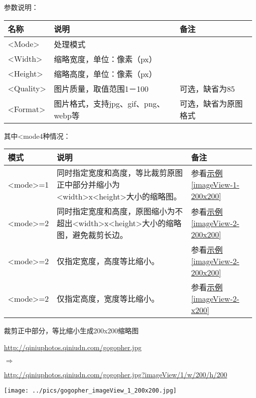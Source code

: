 \documentclass[11pt, oneside]{book}
\newcommand{\qpar}[1]{
\vspace{0.25em}
\noindent
#1\par
\vspace{0.25em}
}
\newcommand{\qurl}[1]{\url{#1}}
\newcommand{\qtable}[1]{\footnotesize\vspace{0.5em}#1\vspace{0.5em}\normalsize}
\begin{document}
\begin{CJK*}{UTF8}{song}
\qpar{参数说明：}
\qtable{
\def\arraystretch{1.5}
\begin{tabular}{|l|l|l|}
\hline
名称 & 说明 & 备注\\
\hline
\textless Mode\textgreater & 处理模式 & \\
\hline
\textless Width\textgreater & 缩略宽度，单位：像素（px） & \\
\hline
\textless Height\textgreater & 缩略高度，单位：像素（px） & \\
\hline
\textless Quality\textgreater & 图片质量，取值范围1－100 & 可选，缺省为85 \\
\hline
\textless Format\textgreater & 图片格式，支持jpg、gif、png、webp等 & 可选，缺省为原图格式 \\
\hline
\end{tabular}
}

\qpar{其中\textless mode4种情况：}
\qtable{
\def\arraystretch{1.5}
\begin{tabular}{|l|p{22em}|l|}
\hline
模式 & 说明 & 备注 \\
\hline
\textless mode\textgreater=1 & 同时指定宽度和高度，等比裁剪原图正中部分并缩小为\textless width\textgreater x\textless height\textgreater 大小的缩略图。& 参看\hyperref[imageView-1-200x200]{示例\ref*{imageView-1-200x200}} \\
\hline
\textless mode\textgreater=2 & 同时指定宽度和高度，原图缩小为不超出\textless width\textgreater x\textless height\textgreater 大小的缩略图，避免裁剪长边。& 参看\hyperref[imageView-2-200x200]{示例\ref*{imageView-2-200x200}} \\
\hline
\textless mode\textgreater=2 & 仅指定宽度，高度等比缩小。 & 参看\hyperref[imageView-2-200x200]{示例\ref*{imageView-2-200x200}} \\
\hline
\textless mode\textgreater=2 & 仅指定高度，宽度等比缩小。 & 参看\hyperref[imageView-2-x200]{示例\ref*{imageView-2-x200}} \\
\hline
\end{tabular}
}

\clearpage

\begin{sample}
  \caption{裁剪正中部分，等比缩小生成200x200缩略图}
  
    \qpar{\qurl{http://qiniuphotos.qiniudn.com/gogopher.jpg}}
    \qpar{$\Rightarrow$}
    \qpar{\qurl{http://qiniuphotos.qiniudn.com/gogopher.jpg?imageView/1/w/200/h/200}}

    \begin{center}
      \texttt{[image: ../pics/gogopher\_imageView\_1\_200x200.jpg]}
    \end{center}


\end{sample}
\end{CJK*}
\end{document}
